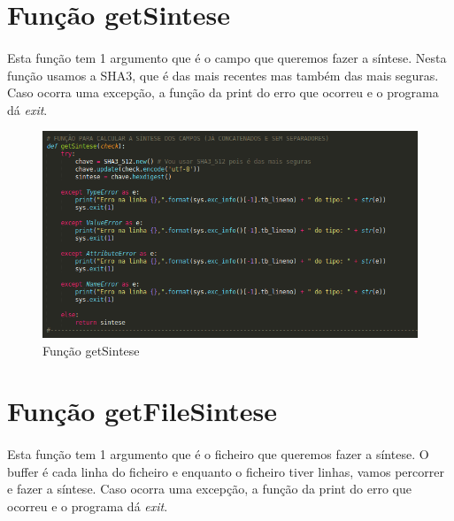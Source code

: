 \documentclass{report}
\begin{document}
\section{Função getSintese }
\label{sec:getSintese}
\paragraph{}
Esta função tem 1 argumento que é o campo que queremos fazer a síntese.
Nesta função usamos a SHA3, que é das mais recentes mas também das mais seguras.
Caso ocorra uma excepção, a função da print do erro que ocorreu e o programa dá \textit{exit}.

\begin{figure}[H]
\centering
\includegraphics[width=1.1\linewidth]{getSintese.png}
\caption{Função getSintese}
\label{getSint}
\end{figure}


\section{Função getFileSintese }
\label{sec:getFileSinte}
\paragraph{}
Esta função tem 1 argumento que é o ficheiro que queremos fazer a síntese.
O buffer é cada linha do ficheiro e enquanto o ficheiro tiver linhas, vamos percorrer e fazer a síntese. \newline
Caso ocorra uma excepção, a função da print do erro que ocorreu e o programa dá \textit{exit}.
\end{document}
